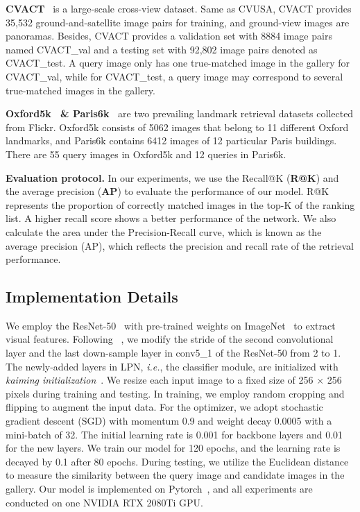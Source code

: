 \documentclass[journal]{IEEEtran}
\def\ie{\emph{i.e.}}
\begin{document}
\textbf{CVACT}~\cite{liu_lending_2019} is a large-scale cross-view dataset. Same as CVUSA, CVACT provides 35,532 ground-and-satellite image pairs for training, and ground-view images are panoramas. Besides, CVACT provides a validation set with 8884 image pairs named CVACT\_val and a testing set with 92,802 image pairs denoted as CVACT\_test. A query image only has one true-matched image in the gallery for CVACT\_val, while for CVACT\_test, a query image may correspond to several true-matched images in the gallery.
\par
\textbf{Oxford5k~\cite{philbin2007object} \& Paris6k~\cite{philbin2008lost}} are two prevailing landmark retrieval datasets collected from Flickr. Oxford5k consists of 5062 images that belong to 11 different Oxford landmarks, and Paris6k contains 6412 images of 12 particular Paris buildings. There are 55 query images in Oxford5k and 12 queries in Paris6k. \par
\textbf{Evaluation protocol.} 
In our experiments, we use the Recall@K (\textbf{R@K}) and the average precision (\textbf{AP}) to evaluate the performance of our model. R@K represents the proportion of correctly matched images in the top-K of the ranking list. A higher recall score shows a better performance of the network. We also calculate the
area under the Precision-Recall curve, which is known
as the average precision (AP), which reflects the
precision and recall rate of the retrieval performance. 
\subsection{Implementation Details} \label{implementation detail}
We employ the ResNet-50~\cite{he2016deep} with pre-trained weights on ImageNet~\cite{5206848} to extract visual features. Following ~\cite{zheng_university-1652_nodate}, we modify the stride of the second convolutional layer and the last down-sample layer in conv5\_1 of the ResNet-50 from 2 to 1. The newly-added layers in LPN, \ie, the classifier module, are initialized with \textit{kaiming initialization}~\cite{kaiming_init}. We resize each input image to a fixed size of 256 $\times$ 256 pixels during training and testing. In training, we employ random cropping and flipping to augment the input data. For the optimizer, we adopt stochastic gradient descent (SGD) with momentum 0.9 and weight decay 0.0005 with a mini-batch of 32. The initial learning rate is 0.001 for backbone layers and 0.01 for the new layers. We train our model for 120 epochs, and the learning rate is decayed by 0.1 after 80 epochs. During testing, we utilize the Euclidean distance to measure the similarity between the query image and candidate images in the gallery. Our model is implemented on Pytorch~\cite{paszke2019pytorch}, and all experiments are conducted on one NVIDIA RTX 2080Ti GPU.
\end{document}

